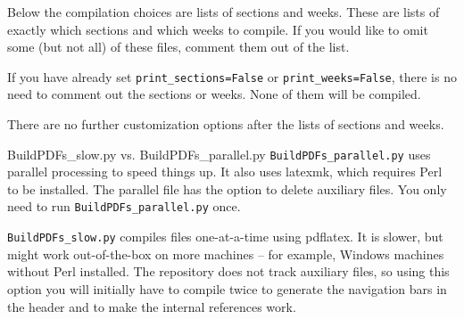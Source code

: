 \documentclass[10pt]{beamer}
\begin{document}
\begin{frame}
Below the compilation choices are lists of sections and weeks. These are lists of exactly which sections and which weeks to compile. If you would like to omit some (but not all) of these files, comment them out of the list.\vfill

If you have already set \texttt{print\_sections=False} or \texttt{print\_weeks=False}, there is no need to comment out the sections or weeks. None of them will be compiled.
\vfill

There are no further customization options after the lists of sections and weeks.
\end{frame}

\begin{frame}{{BuildPDFs\_slow.py} vs. {BuildPDFs\_parallel.py}}
\texttt{BuildPDFs\_parallel.py} uses parallel processing to speed things up. It also uses latexmk, which requires Perl to be installed. The parallel file has the option to delete auxiliary files. You only need to run \texttt{BuildPDFs\_parallel.py} once.
\vfill

\texttt{BuildPDFs\_slow.py} compiles files one-at-a-time using pdflatex. It is slower, but might work out-of-the-box on more machines -- for example, Windows machines without Perl installed. The repository does not track auxiliary files, so using this option you will initially have to compile twice to generate the navigation bars in the header and to make the internal references work.
\end{frame}

\end{document}
